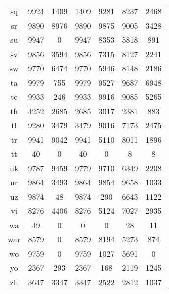 \begin{figure}[h]
\begin{tabular}{ccccccc}
sq&9924&1409&1409&9281&8237&2468\\
sr&9890&8976&9890&9875&9005&3428\\
su&9947&0&9947&8353&5818&891\\
sv&9856&3594&9856&7315&8127&2241\\
sw&9770&6474&9770&5946&8148&2186\\
ta&9979&755&9979&9527&9687&6948\\
te&9933&246&9933&9916&9085&5265\\
th&4252&2685&2685&3017&2381&883\\
tl&9280&3479&3479&9016&7173&2475\\
tr&9941&9042&9941&5110&8011&1896\\
tt&40&0&40&0&8&8\\
uk&9787&9459&9779&9710&6349&2208\\
ur&9864&3493&9864&9854&9658&1033\\
uz&9874&48&9874&290&6643&1122\\
vi&8276&4406&8276&5124&7027&2935\\
wa&49&0&0&0&28&11\\
war&8579&0&8579&8194&5273&874\\
wo&9759&0&9759&1027&5691&0\\
yo&2367&293&2367&168&2119&1245\\
zh&3647&3347&3347&2522&2812&1037\\
\hline\hline
\end{tabular}
\end{figure}
